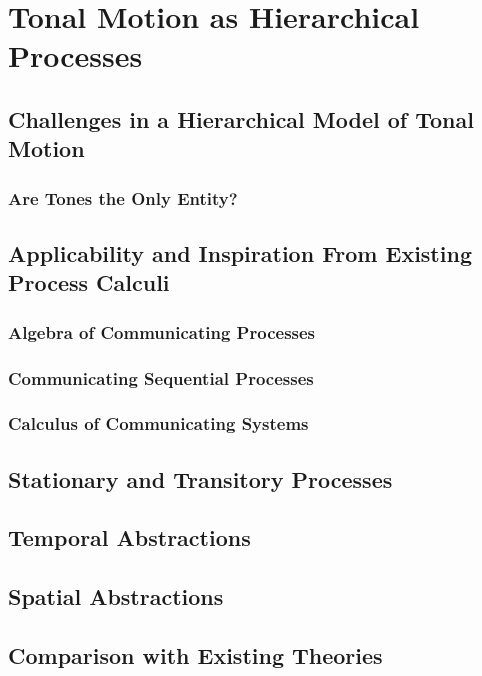 \chapter{Tonal Motion as Hierarchical Processes}
    \section{Challenges in a Hierarchical Model of Tonal Motion}
        \subsection{Are Tones the Only Entity?}
    \section{Applicability and Inspiration From Existing Process Calculi}
        \subsection{Algebra of Communicating Processes}
        \subsection{Communicating Sequential Processes}
        \subsection{Calculus of Communicating Systems}
    \section{Stationary and Transitory Processes}
    \section{Temporal Abstractions}
    \section{Spatial Abstractions}
    \section{Comparison with Existing Theories}